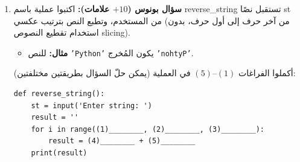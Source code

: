 \documentclass[14pt]{extarticle}
\begin{document}
\begin{enumerate}[label=\textbf{السؤال \arabic*:}, wide=0pt, itemsep=2.2em]
\begin{boxCode}
\begin{english}
\begin{verbatim}
def analyze_numbers():
    even_count = (1)________
    pos_sum = (2)________
    for i in range((3)________):
        num = int(input('Enter number: '))
        if num (4)________ 2 == 0:
            even_count = even_count + (5)________
        if num (6)________ 0:
            pos_sum = pos_sum + (7)________

    print("Even numbers:", (8)________)
    print("Sum of positives:", (9)________)

analyze_numbers()
\end{verbatim}
\end{english}
\end{boxCode}

\ifwithsols
\begin{boxSolution}
\begin{enumerate}[label=(\arabic*)]
\item $0$
\item $0$
\item $10$
\item $\%$
\item $1$
\item $>$
\item \textenglish{\texttt{num}}
\item \textenglish{\texttt{even\_count}}
\item \textenglish{\texttt{pos\_sum}}
\end{enumerate}
\end{boxSolution}
\fi
\filbreak

\item \textbf{سؤال بونوس ($+10$ علامات):}
اكتبوا عملية باسم \textenglish{reverse\_string} تستقبل نصًا \textenglish{st} من المستخدم، وتطبع النص بترتيب عكسي (من آخر حرف إلى أول حرف، بدون استخدام تقطيع النصوص \textenglish{slicing}).
\begin{itemize}
\item \textbf{مثال:} للنص \textenglish{\texttt{'Python'}} يكون المُخرج \textenglish{\texttt{'nohtyP'}}.
\end{itemize}
أكملوا الفراغات $(1)$–$(5)$ في العملية (يمكن حلّ السؤال بطريقتين مختلفتين):

\begin{boxCode}
\begin{english}
\begin{verbatim}
def reverse_string():
    st = input('Enter string: ')
    result = ''
    for i in range((1)________, (2)________, (3)________):
        result = (4)________ + (5)________
    print(result)


\end{verbatim}
\end{english}
\end{boxCode}
\end{enumerate}
\end{document}
